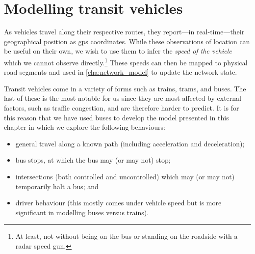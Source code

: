 
\chapter{Modelling transit vehicles}
\label{cha:vehicle_model}

As vehicles travel along their respective routes, they report---in real-time---their geographical position as \gls{gps} coordinates. While these observations of location can be useful on their own, we wish to use them to infer the \emph{speed of the vehicle} which we cannot observe directly.\footnote{At least, not without being on the bus or standing on the roadside with a radar speed gun.} These speeds can then be mapped to physical road segments and used in \cref{cha:network_model} to update the network state.

Transit vehicles come in a variety of forms such as trains, trams, and buses. The last of these is the most notable for us since they are most affected by external factors, such as traffic congestion, and are therefore harder to predict. It is for this reason that we have used buses to develop the model presented in this chapter in which we explore the following behaviours:
\begin{itemize}
\item general travel along a known path (including acceleration and deceleration);
\item bus stops, at which the bus may (or may not) stop;
\item intersections (both controlled and uncontrolled) which may (or may not) temporarily halt a bus; and
\item driver behaviour (this mostly comes under vehicle speed but is more significant in modelling buses versus trains).
\end{itemize}


